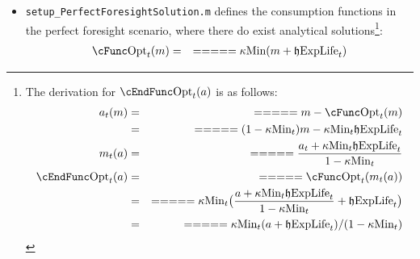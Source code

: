 \documentclass[titlepage,abstract]{\econtex}
\providecommand{\kappaMin}{\kappa\text{Min}}
\providecommand{\cFuncOpt}{\cFunc\text{Opt}}
\providecommand{\cEndFuncOpt}{\cEndFunc\text{Opt}}
\providecommand{\hEndExpLife}{\mathfrak{h}\text{ExpLife}}
\providecommand{\uP}{u\text{P}}
\providecommand{\uPP}{u\text{PP}}
\begin{document}
\begin{itemize}
\begin{equation}
\begin{gathered}
\begin{aligned}
      u(c)      &=& =  =  =  =  =  c^{1-\rho}/(1-\rho) \\
      \uP(c)      &=& =  =  =  =  = 
      \begin{cases}
      c^{-\rho} & \forall c>0 \\
      \infty & \forall c \leq 0
      \end{cases} \\
      \uPP(c)      &=& =  =  =  =  =  -\rho c^{-\rho-1} \\
      n(z)      &=& =  =  =  =  =  (z(1-\rho))^{1/(1-\rho)} \\
      nP(z)      &=& =  =  =  =  =  z^{-1/\rho} \\
      nPP(z)      &=& =  =  =  =  =  (-z/\rho)^{-1/(\rho+1)}
      \end{aligned}\end{gathered}\end{equation}
      \item \texttt{setup\_PerfectForesightSolution.m} defines the consumption functions in the perfect foresight scenario, where there do exist analytical solutions\footnote{
          The derivation for $\cEndFuncOpt_{t}(a)$ is as follows:
          \begin{equation}\begin{gathered}\begin{aligned}
          a_{t}(m)      &=& =  =  =  =  =  m-\cFuncOpt_{t}(m) \\
               &=& =  =  =  =  =  (1-\kappaMin_{t}) m -\kappaMin_{t} \hEndExpLife_{t} \\
          m_{t} (a)      &=& =  =  =  =  =  \frac{a_{t}+ \kappaMin_{t}\hEndExpLife_{t}}{1-\kappaMin_{t}} \\
          \cEndFuncOpt_{t} (a)      &=& =  =  =  =  =  \cFuncOpt_{t}(m_{t}(a)) \\
               &=& =  =  =  =  =  \kappaMin_{t} \big(\frac{a+ \kappaMin_{t}\hEndExpLife_{t}}{1-\kappaMin_{t}} + \hEndExpLife_{t}\big) \\
               &=& =  =  =  =  =  \kappaMin_{t} (a+ \hEndExpLife_{t})/(1-\kappaMin_{t})
          \end{aligned}\end{gathered}\end{equation}
          }:
          \begin{equation}\begin{gathered}\begin{aligned}
          \cFuncOpt_{t}(m)      &=& =  =  =  =  =  \kappaMin (m+\hEndExpLife_{t}) \\

\end{aligned}
\end{gathered}
\end{equation}
\end{itemize}
\end{document}
